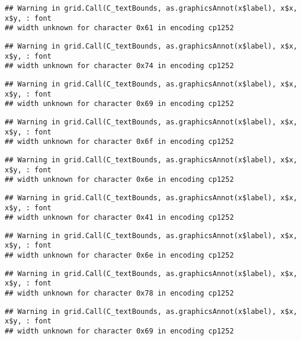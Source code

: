 \documentclass[
]{article}
\begin{document}
\begin{verbatim}
## Warning in grid.Call(C_textBounds, as.graphicsAnnot(x$label), x$x, x$y, : font
## width unknown for character 0x61 in encoding cp1252
\end{verbatim}

\begin{verbatim}
## Warning in grid.Call(C_textBounds, as.graphicsAnnot(x$label), x$x, x$y, : font
## width unknown for character 0x74 in encoding cp1252
\end{verbatim}

\begin{verbatim}
## Warning in grid.Call(C_textBounds, as.graphicsAnnot(x$label), x$x, x$y, : font
## width unknown for character 0x69 in encoding cp1252
\end{verbatim}

\begin{verbatim}
## Warning in grid.Call(C_textBounds, as.graphicsAnnot(x$label), x$x, x$y, : font
## width unknown for character 0x6f in encoding cp1252
\end{verbatim}

\begin{verbatim}
## Warning in grid.Call(C_textBounds, as.graphicsAnnot(x$label), x$x, x$y, : font
## width unknown for character 0x6e in encoding cp1252
\end{verbatim}

\begin{verbatim}
## Warning in grid.Call(C_textBounds, as.graphicsAnnot(x$label), x$x, x$y, : font
## width unknown for character 0x41 in encoding cp1252
\end{verbatim}

\begin{verbatim}
## Warning in grid.Call(C_textBounds, as.graphicsAnnot(x$label), x$x, x$y, : font
## width unknown for character 0x6e in encoding cp1252
\end{verbatim}

\begin{verbatim}
## Warning in grid.Call(C_textBounds, as.graphicsAnnot(x$label), x$x, x$y, : font
## width unknown for character 0x78 in encoding cp1252
\end{verbatim}

\begin{verbatim}
## Warning in grid.Call(C_textBounds, as.graphicsAnnot(x$label), x$x, x$y, : font
## width unknown for character 0x69 in encoding cp1252
\end{verbatim}
\end{document}
